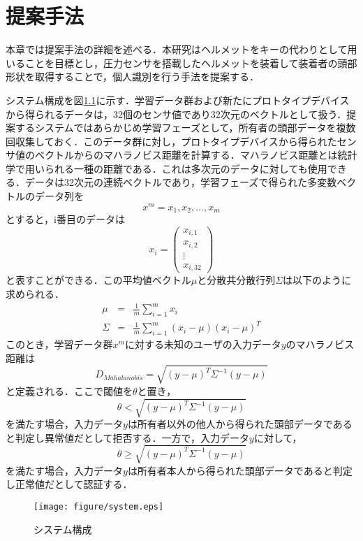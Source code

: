 \chapter{提案手法}
\label{method}
本章では提案手法の詳細を述べる．本研究はヘルメットをキーの代わりとして用いることを目標とし，圧力センサを搭載したヘルメットを装着して装着者の頭部形状を取得することで，個人識別を行う手法を提案する．\par
システム構成を図\ref{system}に示す．学習データ群および新たにプロトタイプデバイスから得られるデータは，32個のセンサ値であり32次元のベクトルとして扱う．提案するシステムではあらかじめ学習フェーズとして，所有者の頭部データを複数回収集しておく．このデータ群に対し，プロトタイプデバイスから得られたセンサ値のベクトルからのマハラノビス距離を計算する．マハラノビス距離とは統計学で用いられる一種の距離である．これは多次元のデータに対しても使用できる．データは32次元の連続ベクトルであり，学習フェーズで得られた多変数ベクトルのデータ列を
\[
  x^m = x_1, x_2, \ldots, x_m
\]
とすると，i番目のデータは
\[
  x_i = \left(
        \begin{array}{c}
            x_{i,1} \\
            x_{i,2} \\
            \vdots \\
            x_{i,32}
        \end{array}
    \right)
\]
と表すことができる．この平均値ベクトル$\mu$と分散共分散行列$\Sigma$は以下のように求められる．
\begin{eqnarray*}
  \mu &=& \frac{1}{m}\sum_{i=1}^{m}x_i \\
  \Sigma &=& \frac{1}{m}\sum_{i=1}^{m}(x_i-\mu)(x_i-\mu)^T
\end{eqnarray*}
このとき，学習データ群$x^m$に対する未知のユーザの入力データ$y$のマハラノビス距離は
\[
  D_{Mahalanobis} = \sqrt{(y-\mu)^{T}\Sigma^{-1}(y-\mu)}
\]
と定義される．ここで閾値を$\theta$と置き，
\[
  \theta < \sqrt{(y-\mu)^{T}\Sigma^{-1}(y-\mu)}
\]
を満たす場合，入力データ$y$は所有者以外の他人から得られた頭部データであると判定し異常値だとして拒否する．一方で，入力データ$y$に対して，
\[
  \theta \geq \sqrt{(y-\mu)^{T}\Sigma^{-1}(y-\mu)}
\]
を満たす場合，入力データ$y$は所有者本人から得られた頭部データであると判定し正常値だとして認証する．

\begin{figure}[!t]
  \begin{center}
    \texttt{[image: figure/system.eps]}
  \end{center}
  \caption{システム構成}
  \label{system}
\end{figure}